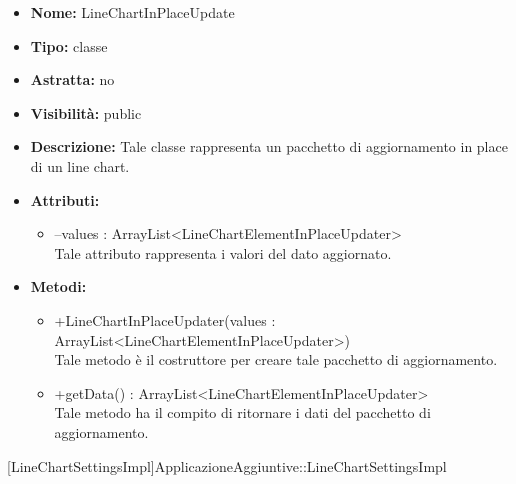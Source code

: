 			
			\begin{itemize}
			\item \textbf{Nome:} LineChartInPlaceUpdate
			\item \textbf{Tipo:} classe
			
		\item \textbf{Astratta:}
		no
			\item \textbf{Visibilità:} public
			\item \textbf{Descrizione:} Tale classe rappresenta un pacchetto di aggiornamento in place di un line chart.
			\item \textbf{Attributi:}
				\begin{itemize}
				\setlength{\itemsep}{5pt}
				
					\item[\ding{111}] {--values : ArrayList<LineChartElementInPlaceUpdater>} \\ [1mm] Tale attributo rappresenta i valori del dato aggiornato.
				\end{itemize}
		
			\item \textbf{Metodi:}
				\begin{itemize}
				\setlength{\itemsep}{5pt}
				
					\item[\ding{111}] {{+LineChartInPlaceUpdater(values : ArrayList<LineChartElementInPlaceUpdater>)}} \\ [1mm] Tale metodo è il costruttore per creare tale pacchetto di aggiornamento.
					\item[\ding{111}] {{+getData() : ArrayList<LineChartElementInPlaceUpdater>}} \\ [1mm] Tale metodo ha il compito di ritornare i dati del pacchetto di aggiornamento.
				\end{itemize}
		
			\end{itemize}
	
			[LineChartSettingsImpl]{ApplicazioneAggiuntive::LineChartSettingsImpl}
			

	
